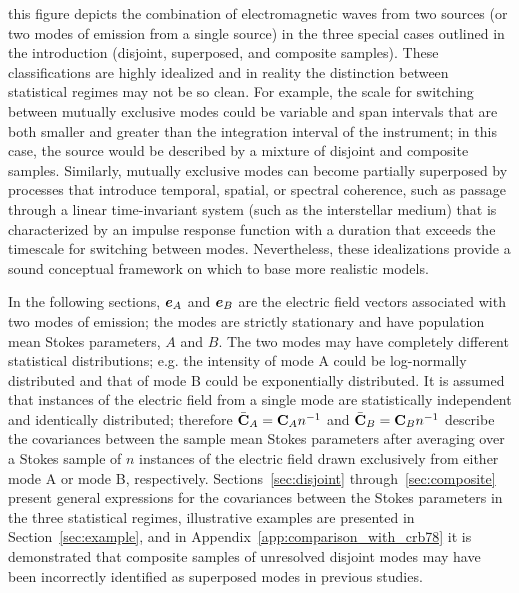 \documentclass[twocolumn]{aastex6}
\newcommand{\mbf}[1]{\mbox{\boldmath $#1$}}
\newcommand{\Sec}[1]{Section~\ref{sec:#1}}
\newcommand{\Secs}[3]{Sections~\ref{sec:#1} #2~\ref{sec:#3}}
\newcommand{\App}[1]{Appendix~\ref{app:#1}}
\begin{document}
this figure depicts the combination of electromagnetic waves from two
sources (or two modes of emission from a single source) in the three
special cases outlined in the introduction (disjoint, superposed, and
composite samples).
%
These classifications are highly idealized and in reality the
distinction between statistical regimes may not be so clean.
%
For example, the scale for switching between mutually exclusive modes
could be variable and span intervals that are both smaller and
greater than the integration interval of the instrument; in this case,
the source would be described by a mixture of disjoint and
composite samples.
%
Similarly, mutually exclusive modes can become partially superposed by
processes that introduce temporal, spatial, or spectral coherence,
such as passage through a linear time-invariant system (such as the
interstellar medium) that is characterized by an impulse response
function with a duration that exceeds the timescale for switching
between modes.
%
Nevertheless, these idealizations provide a sound conceptual framework
on which to base more realistic models.

In the following sections, $\mbf{e}_A$ and $\mbf{e}_B$ are the
electric field vectors associated with two modes of emission; the
modes are strictly stationary and have population mean Stokes
parameters, $A$ and $B$.
%
The two modes may have completely different statistical distributions;
e.g. the intensity of mode A could be log-normally distributed and that
of mode B could be exponentially distributed.
%
It is assumed that instances of the electric field from a single mode
are statistically independent and identically distributed; therefore
%
$\bar{\bf C}_A={\bf C}_A n^{-1}$ 
and 
$\bar{\bf C}_B={\bf C}_B n^{-1}$
%
describe the covariances between the sample mean Stokes parameters
after averaging over a Stokes sample of $n$ instances of the electric
field drawn exclusively from either mode A or mode B, respectively.
%
\Secs{disjoint}{through}{composite} present general expressions for
the covariances between the Stokes parameters in the three statistical
regimes, illustrative examples are presented in \Sec{example}, and in
\App{comparison_with_crb78} it is demonstrated that composite samples
of unresolved disjoint modes may have been incorrectly identified as
superposed modes in previous studies.


\end{document}
